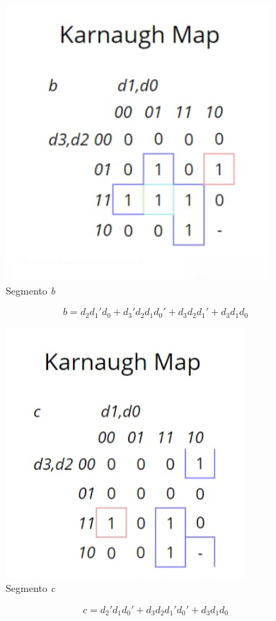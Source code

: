\documentclass[
	article,			%
	11pt,				%
	oneside,			%
	a4paper,			%
	english,			%
	brazil,				%
	sumario=tradicional
	]{abntex2}
\begin{document}
\begin{itemize}
\begin{figure} [H]
    \centering
    \includegraphics[width=0.3\linewidth]{b.png}
    \caption{Segmento \textit{b}}
    \label{fig:seg-b}
\end{figure}
$$
b = d_2d_1'd_0 + d_3'd_2d_1d_0' + d_3d_2d_1' + d_3d_1d_0
$$
\begin{figure} [H]
    \centering
    \includegraphics[width=0.3\linewidth]{c.png}
    \caption{Segmento \textit{c}}
    \label{fig:seg-c}
\end{figure}
$$
c = d_2'd_1d_0' + d_3d_2d_1'd_0' + d_3d_1d_0
$$


\end{itemize}
\end{document}
